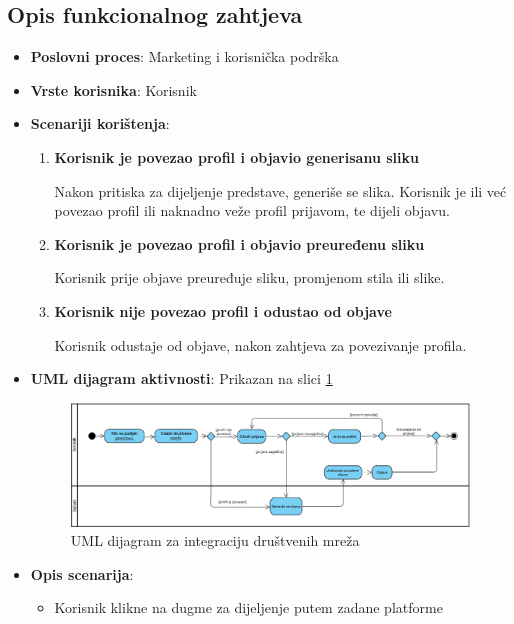 \subsection{Opis funkcionalnog zahtjeva}  
\begin{itemize}  
    \item \textbf{Poslovni proces}: Marketing i korisnička podrška  
    \item \textbf{Vrste korisnika}: Korisnik  
    \item \textbf{Scenariji korištenja}:  
        \begin{enumerate}  
            \item \textbf{Korisnik je povezao profil i objavio generisanu sliku}

            Nakon pritiska za dijeljenje predstave, generiše se slika. Korisnik je ili već povezao profil ili naknadno veže profil prijavom, te dijeli objavu.
            
            \item \textbf{Korisnik je povezao profil i objavio preuređenu sliku}

            Korisnik prije objave preuređuje sliku, promjenom stila ili slike.
            
            \item \textbf{Korisnik nije povezao profil i odustao od objave}

            Korisnik odustaje od objave, nakon zahtjeva za povezivanje profila.
            
        \end{enumerate}  
    \item \textbf{UML dijagram aktivnosti}: Prikazan na slici \ref{fig:fz5UML} 
\begin{figure}[H]
    \centering
    \includegraphics[width=1\linewidth]{Slike/FZ5/allmyhomieshatevpd.png}
    \caption{UML dijagram za integraciju društvenih mreža}
    \label{fig:fz5UML}
\end{figure}
    \item \textbf{Opis scenarija}:  
        \begin{itemize}  
            \item Korisnik klikne na dugme za dijeljenje putem zadane platforme  
            

\end{itemize}
\end{itemize}
